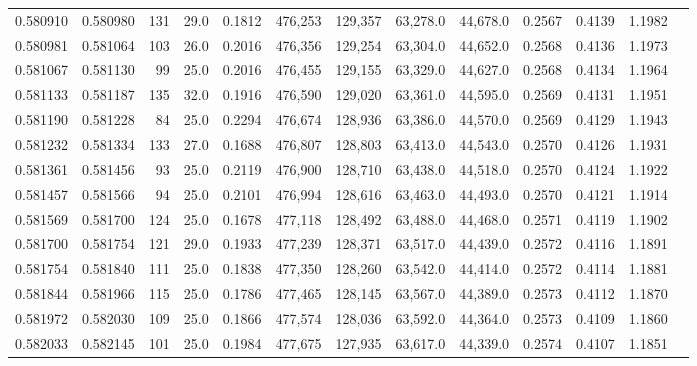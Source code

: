 \begin{tabular}{rrrrrrrrrrrrr}
0.580910 & 0.580980 &   131 & 29.0 &                                     0.1812 & 476,253 & 129,357 &  63,278.0 &  44,678.0 & 0.2567 & 0.4139 & 1.1982 \\
0.580981 & 0.581064 &   103 & 26.0 &                                     0.2016 & 476,356 & 129,254 &  63,304.0 &  44,652.0 & 0.2568 & 0.4136 & 1.1973 \\
0.581067 & 0.581130 &    99 & 25.0 &                                     0.2016 & 476,455 & 129,155 &  63,329.0 &  44,627.0 & 0.2568 & 0.4134 & 1.1964 \\
0.581133 & 0.581187 &   135 & 32.0 &                                     0.1916 & 476,590 & 129,020 &  63,361.0 &  44,595.0 & 0.2569 & 0.4131 & 1.1951 \\
0.581190 & 0.581228 &    84 & 25.0 &                                     0.2294 & 476,674 & 128,936 &  63,386.0 &  44,570.0 & 0.2569 & 0.4129 & 1.1943 \\
0.581232 & 0.581334 &   133 & 27.0 &                                     0.1688 & 476,807 & 128,803 &  63,413.0 &  44,543.0 & 0.2570 & 0.4126 & 1.1931 \\
0.581361 & 0.581456 &    93 & 25.0 &                                     0.2119 & 476,900 & 128,710 &  63,438.0 &  44,518.0 & 0.2570 & 0.4124 & 1.1922 \\
0.581457 & 0.581566 &    94 & 25.0 &                                     0.2101 & 476,994 & 128,616 &  63,463.0 &  44,493.0 & 0.2570 & 0.4121 & 1.1914 \\
0.581569 & 0.581700 &   124 & 25.0 &                                     0.1678 & 477,118 & 128,492 &  63,488.0 &  44,468.0 & 0.2571 & 0.4119 & 1.1902 \\
0.581700 & 0.581754 &   121 & 29.0 &                                     0.1933 & 477,239 & 128,371 &  63,517.0 &  44,439.0 & 0.2572 & 0.4116 & 1.1891 \\
0.581754 & 0.581840 &   111 & 25.0 &                                     0.1838 & 477,350 & 128,260 &  63,542.0 &  44,414.0 & 0.2572 & 0.4114 & 1.1881 \\
0.581844 & 0.581966 &   115 & 25.0 &                                     0.1786 & 477,465 & 128,145 &  63,567.0 &  44,389.0 & 0.2573 & 0.4112 & 1.1870 \\
0.581972 & 0.582030 &   109 & 25.0 &                                     0.1866 & 477,574 & 128,036 &  63,592.0 &  44,364.0 & 0.2573 & 0.4109 & 1.1860 \\
0.582033 & 0.582145 &   101 & 25.0 &                                     0.1984 & 477,675 & 127,935 &  63,617.0 &  44,339.0 & 0.2574 & 0.4107 & 1.1851 \\

\end{tabular}
